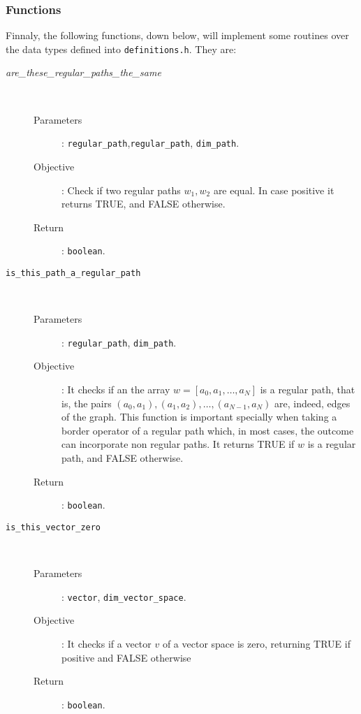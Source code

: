 \documentclass[11pt,a4paper]{article}
\begin{document}
\subsubsection{Functions}
Finnaly, the following functions, down below, will implement some routines over the data types
defined into \texttt{definitions.h}. They are:
\begin{description}
	\item [\textit{are\_these\_regular\_paths\_the\_same}] \hfill \\[-0.5cm]
		\begin{description}
			\item [Parameters]: \texttt{regular\_path},\texttt{regular\_path}, \texttt{dim\_path}.
			\item [Objective]: Check if two regular paths $w_1, w_2$ are equal.
				In case positive it returns TRUE, and FALSE otherwise.
			\item [Return]: \texttt{boolean}.
		\end{description}

	\item [\texttt{is\_this\_path\_a\_regular\_path}] \hfill \\[-0.5cm]
		\begin{description}
			\item [Parameters]: \texttt{regular\_path}, \texttt{dim\_path}.
			\item [Objective]: It checks if an the array $w = [a_0, a_1, \ldots, a_N]$
				is a regular path, that is, the pairs $(a_0, a_1), (a_1,a_2),
				\ldots, (a_{N-1}, a_N)$ are, indeed, edges of the graph.
				This function is important specially when taking a border
				operator of a regular path which, in most cases, the outcome
				can incorporate non regular paths. It returns TRUE if $w$
				is a regular path, and FALSE otherwise.
			\item [Return]: \texttt{boolean}.
		\end{description}

	\item [\texttt{is\_this\_vector\_zero}] \hfill \\[-0.5cm]
		\begin{description}
			\item [Parameters]: \texttt{vector}, \texttt{dim\_vector\_space}.
			\item [Objective]: It checks if a vector $v$ of a vector space is
				zero, returning TRUE if positive and FALSE otherwise
			\item [Return]: \texttt{boolean}.
		\end{description}


\end{description}
\end{document}
